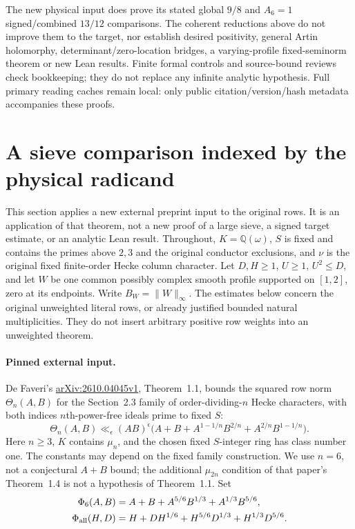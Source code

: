 \documentclass[11pt]{article}
\theoremstyle{definition}\newtheorem{definition}[theorem]{Definition}
\theoremstyle{remark}\newtheorem{remark}[theorem]{Remark}
\begin{document}
The new physical input does prove its stated global $9/8$ and
$A_6=1$ signed/combined $13/12$ comparisons. The coherent reductions
above do not improve them to the target, nor establish desired
positivity, general Artin holomorphy, determinant/zero-location
bridges, a varying-profile fixed-seminorm theorem or new Lean results.
Finite formal controls and source-bound reviews check bookkeeping;
they do not replace any infinite analytic hypothesis. Full primary
reading caches remain local: only public citation/version/hash
metadata accompanies these proofs.

\section{A sieve comparison indexed by the physical radicand}\label{phy:core}
This section applies a new external preprint input to the original rows.
It is an application of that theorem, not a new proof of a large sieve,
a signed target estimate, or an analytic Lean result.
Throughout, $K=\mathbb Q(\omega)$, $S$ is fixed and contains the primes
above $2,3$ and the original conductor exclusions, and $\nu$ is the
original fixed finite-order Hecke column character. Let $D,H\ge1$, $U\ge1$,
$U^2\le D$, and let $W$ be one common possibly complex smooth profile
supported on $[1,2]$, zero at its endpoints. Write $B_W=\|W\|_\infty$.
The estimates below concern the original unweighted literal rows, or
already justified bounded natural multiplicities. They do not insert
arbitrary positive row weights into an unweighted theorem.

\paragraph{Pinned external input.}
De Faveri's \href{https://arxiv.org/abs/2610.04045v1}{arXiv:2610.04045v1},
Theorem~1.1, bounds the squared row norm $\Theta_n(A,B)$ for the
Section~2.3 family of order-dividing-$n$ Hecke characters, with both
indices $n$th-power-free ideals prime to fixed $S$:
\begin{equation}\label{phy:input}
 \Theta_n(A,B)\ll_\epsilon(AB)^\epsilon
 \bigl(A+B+A^{1-1/n}B^{2/n}+A^{2/n}B^{1-1/n}\bigr).
\end{equation}
Here $n\ge3$, $K$ contains $\mu_n$, and the chosen fixed $S$-integer
ring has class number one. The constants may depend on the fixed
family construction. We use $n=6$, not a conjectural $A+B$ bound;
the additional $\mu_{2n}$ condition of that paper's Theorem~1.4 is
not a hypothesis of Theorem~1.1. Set
\begin{align*}
 \Phi_6(A,B)&=A+B+A^{5/6}B^{1/3}+A^{1/3}B^{5/6},\\
 \Phi_{\rm all}(H,D)&=H+DH^{1/6}
       +H^{5/6}D^{1/3}+H^{1/3}D^{5/6}.
\end{align*}
\end{document}
